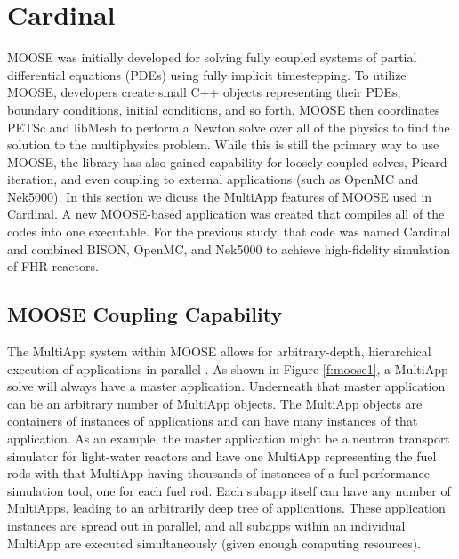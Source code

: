 \section{Cardinal}
\label{s:cardinal}

MOOSE was initially developed for solving fully coupled systems of partial
differential equations (PDEs) using fully implicit timestepping. To utilize
MOOSE, developers create small C++ objects representing their PDEs, boundary
conditions, initial conditions, and so forth. MOOSE then coordinates PETSc and
libMesh \cite{kirk2006libmesh} to perform a Newton solve over all of the
physics to find the solution to the multiphysics problem. While this is still
the primary way to use MOOSE, the library has also gained capability for
loosely coupled solves, Picard iteration, and even coupling to external
applications (such as OpenMC and Nek5000).  In this section we dicuss the
MultiApp features of MOOSE used in Cardinal.  A new MOOSE-based application was
created \cite{cardinal}  that compiles all of the codes into one executable.
For the previous study, that code was named Cardinal and combined BISON,
OpenMC, and Nek5000 to achieve high-fidelity simulation of FHR reactors.

\subsection{MOOSE Coupling Capability}

The MultiApp system within MOOSE allows for arbitrary-depth, hierarchical execution of applications in parallel \cite{gaston2015physics}. As shown in Figure \ref{f:moose1}, a MultiApp solve will always have a master application. Underneath that master application can be an arbitrary number of MultiApp objects. The MultiApp objects are containers of instances of applications and can have many instances of that application. As an example, the master application might be a neutron transport simulator for light-water reactors and have one MultiApp representing the fuel rods with that MultiApp having thousands of instances of a fuel performance simulation tool, one for each fuel rod. Each subapp itself can have any number of MultiApps, leading to an arbitrarily deep tree of applications. These application instances are spread out in parallel, and all subapps within an individual MultiApp are executed simultaneously (given enough computing resources).

